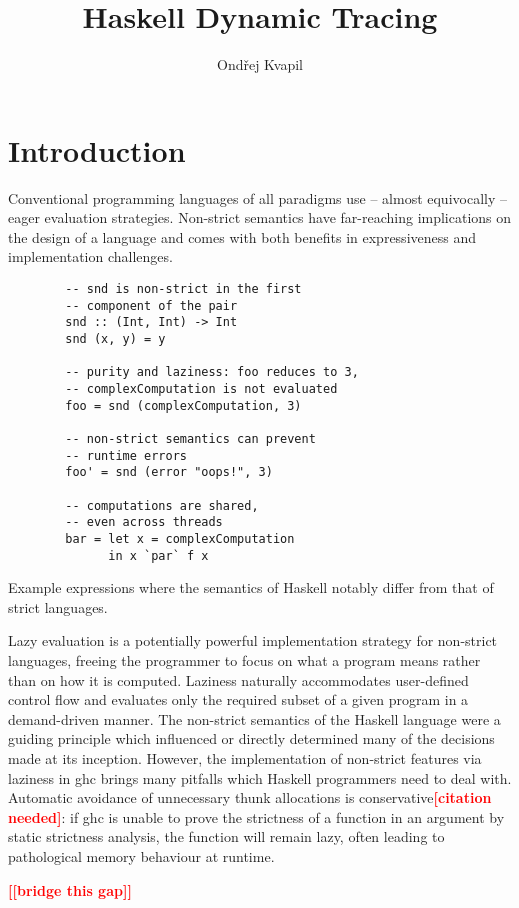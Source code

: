 \documentclass[thesis=B,english]{FITthesis}[2019/12/23]
\title{Haskell Dynamic Tracing}
\author{Ondřej Kvapil} %
\newcommand{\todo}[1]{\textcolor{red}{\textbf{[[#1]]}}}
\newcommand{\citationNeeded}{\textcolor{red}{\textbf{[citation needed]}}}
\begin{document}
\chapter{Introduction} \label{sec:intro}
Conventional programming languages of all paradigms use -- almost equivocally
-- eager evaluation strategies. Non-strict semantics have far-reaching
implications on the design of a language\cite{haskell-is-pure} and comes with
both benefits in expressiveness and implementation challenges.

\begin{listing}[h]
	\centering
	\begin{verbatim}
		-- snd is non-strict in the first
		-- component of the pair
		snd :: (Int, Int) -> Int
		snd (x, y) = y

		-- purity and laziness: foo reduces to 3,
		-- complexComputation is not evaluated
		foo = snd (complexComputation, 3)

		-- non-strict semantics can prevent
		-- runtime errors
		foo' = snd (error "oops!", 3)

		-- computations are shared,
		-- even across threads
		bar = let x = complexComputation
		      in x `par` f x
	\end{verbatim}
	\caption[Example lazy expressions.]{Example expressions where the semantics
	of Haskell notably differ from that of strict languages.}
	\label{lst:let-x}
\end{listing}

Lazy evaluation is a potentially powerful implementation strategy
for non-strict languages, freeing the programmer to focus on what a program
means rather than on how it is computed. Laziness naturally accommodates
user-defined control flow and evaluates only the required subset of a given
program in a demand-driven manner. The non-strict semantics of the Haskell
language were a guiding principle which influenced or directly determined many
of the decisions made at its inception\cite{history-of-haskell}. However, the
implementation of non-strict features via laziness in \acrshort{ghc} brings
many pitfalls which Haskell programmers need to deal with. Automatic avoidance
of unnecessary thunk allocations is conservative\citationNeeded: if
\acrshort{ghc} is unable to prove the strictness of a function in an argument
by static strictness analysis, the function will remain lazy, often leading to
pathological memory behaviour at runtime.

\todo{bridge this gap}
\end{document}
